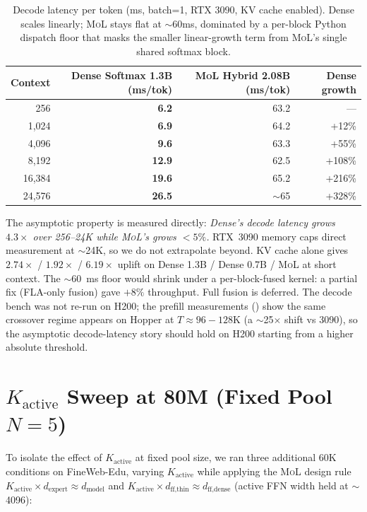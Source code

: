 \documentclass[10pt]{article}
\newcommand{\mol}{\textsc{MoL}}
\begin{document}
\begin{table}[h]
\centering\small
\caption{Decode latency per token (ms, batch=1, RTX 3090, KV cache enabled). Dense scales linearly; \mol{} stays flat at $\sim$60ms, dominated by a per-block Python dispatch floor that masks the smaller linear-growth term from \mol{}'s single shared softmax block.}
\label{tab:decode_latency}
\begin{tabular}{rrrr}
\toprule
Context & Dense Softmax 1.3B (ms/tok) & \mol{} Hybrid 2.08B (ms/tok) & Dense growth \\
\midrule
256     & \textbf{6.2}  & 63.2 & — \\
1{,}024 & \textbf{6.9}  & 64.2 & +12\% \\
4{,}096 & \textbf{9.6}  & 63.3 & +55\% \\
8{,}192 & \textbf{12.9} & 62.5 & +108\% \\
16{,}384 & \textbf{19.6} & 65.2 & +216\% \\
24{,}576 & \textbf{26.5} & $\sim$65 & +328\% \\
\bottomrule
\end{tabular}
\end{table}

The asymptotic property is measured directly: \emph{Dense's decode latency grows $4.3\times$ over 256--24K while \mol{}'s grows $<5\%$.} RTX~3090 memory caps direct measurement at $\sim$24K, so we do not extrapolate beyond. KV cache alone gives $2.74\times$ / $1.92\times$ / $6.19\times$ uplift on Dense 1.3B / Dense 0.7B / \mol{} at short context. The $\sim$60~ms floor would shrink under a per-block-fused kernel: a partial fix (FLA-only fusion) gave $+8\%$ throughput. Full fusion is deferred. The decode bench was not re-run on H200; the prefill measurements () show the same crossover regime appears on Hopper at $T{\approx}96{-}128$K (a $\sim$25$\times$ shift vs 3090), so the asymptotic decode-latency story should hold on H200 starting from a higher absolute threshold.

\section{$K_\textrm{active}$ Sweep at 80M (Fixed Pool $N{=}5$)}
\label{app:kactive}

To isolate the effect of $K_\textrm{active}$ at fixed pool size, we ran three additional 60K conditions on FineWeb-Edu, varying $K_\textrm{active}$ while applying the \mol{} design rule $K_\textrm{active} \times d_\textrm{expert} \approx d_\textrm{model}$ and $K_\textrm{active} \times d_\textrm{ff,thin} \approx d_\textrm{ff,dense}$ (active FFN width held at $\sim$4096):
\end{document}
